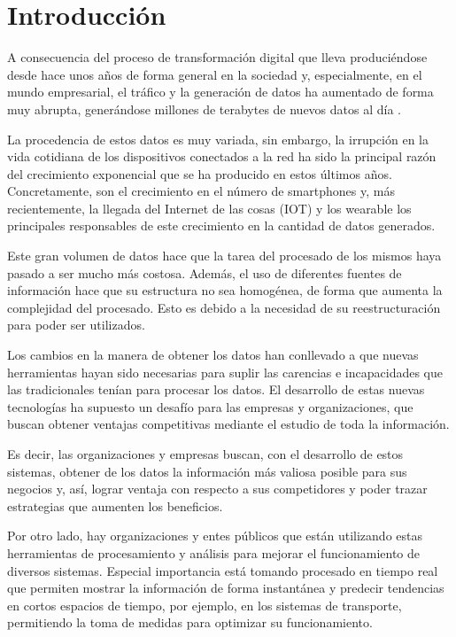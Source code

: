 \chapter{Introducción \label{sec:intro}}

A consecuencia del proceso de transformación digital que lleva produciéndose desde hace unos años de forma general en la sociedad y, especialmente, en el mundo empresarial, el tráfico y la generación de datos ha aumentado de forma muy abrupta, generándose millones de terabytes de nuevos datos al día \cite{BDStats}. 


La procedencia de estos datos es muy variada, sin embargo, la irrupción en la vida cotidiana de los dispositivos conectados a la red ha sido la principal razón del crecimiento exponencial que se ha producido en estos últimos años. Concretamente, son el crecimiento en el número de smartphones \cite{phoneGrowth} y, más recientemente, la llegada del Internet de las cosas (IOT) y los wearable los principales responsables de este crecimiento en la cantidad de datos generados. 

Este gran volumen de datos hace que la tarea del procesado de los mismos haya pasado a ser mucho más costosa. Además, el uso de diferentes fuentes de información hace que su estructura no sea homogénea, de forma que aumenta la complejidad del procesado. Esto es debido a la necesidad de su reestructuración para poder ser utilizados.

Los cambios en la manera de obtener los datos han conllevado a que nuevas herramientas hayan sido necesarias para suplir las carencias e incapacidades que las tradicionales tenían para procesar los datos. El desarrollo de estas nuevas tecnologías ha supuesto un desafío para las empresas y organizaciones, que buscan obtener ventajas competitivas mediante el estudio de toda la información.

Es decir, las organizaciones y empresas buscan, con el desarrollo de estos sistemas, obtener de los datos la información más valiosa posible para sus negocios y, así, lograr ventaja con respecto a sus competidores y poder trazar estrategias que aumenten los beneficios.

Por otro lado, hay organizaciones y entes públicos que están utilizando estas herramientas de procesamiento y análisis para mejorar el funcionamiento de diversos sistemas. Especial importancia está tomando procesado en tiempo real que permiten mostrar la información de forma instantánea y predecir tendencias en cortos espacios de tiempo, por ejemplo, en los sistemas de transporte, permitiendo la toma de medidas para optimizar su funcionamiento. 

